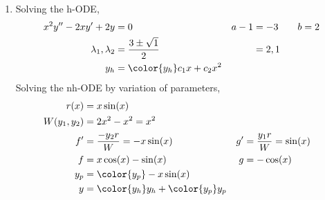 \begin{enumerate}
    \item Solving the h-ODE,
          \begin{align}
              x^{2}y'' - 2xy' + 2y     & = 0                                 & a - 1 & = -3 \qquad b = 2 \\
              \lambda_{1}, \lambda_{2} & = \frac{3 \pm \sqrt{1}}{2}          &       & = 2, 1            \\
              y_{h}                    & = {\color{y_h} c_{1}x + c_{2}x^{2}}
          \end{align}
          Solving the nh-ODE by variation of parameters,
          \begin{align}
              r(x)            & = x\sin(x)                                                                      \\
              W(y_{1}, y_{2}) & = 2x^{2} - x^{2} = x^{2}                                                        \\
              f'              & = \frac{-y_{2}r}{W} = -x\sin(x)             & g' & = \frac{y_{1}r}{W} = \sin(x) \\
              f               & = x\cos(x) - \sin(x)                        & g  & = -\cos(x)                   \\
              y_{p}           & = {\color{y_p} -x\sin(x)}                                                       \\
              y               & = {\color{y_h} y_{h}} + {\color{y_p} y_{p}}
          \end{align}


\end{enumerate}
